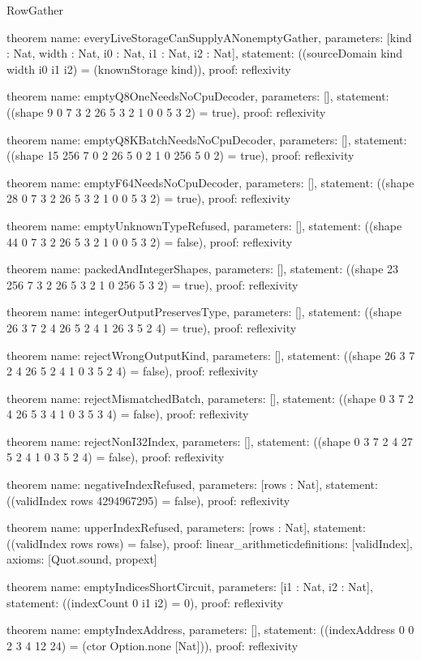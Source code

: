 \begin{lexlean}{RowGather}
\begin{semanticmodule}
theorem{
  name: everyLiveStorageCanSupplyANonemptyGather,
  parameters: [kind : Nat, width : Nat, i0 : Nat, i1 : Nat, i2 : Nat],
  statement: ((sourceDomain kind width i0 i1 i2) = (knownStorage kind)),
  proof: reflexivity{}
}

theorem{
  name: emptyQ8OneNeedsNoCpuDecoder,
  parameters: [],
  statement: ((shape 9 0 7 3 2 26 5 3 2 1 0 0 5 3 2) = true),
  proof: reflexivity{}
}

theorem{
  name: emptyQ8KBatchNeedsNoCpuDecoder,
  parameters: [],
  statement: ((shape 15 256 7 0 2 26 5 0 2 1 0 256 5 0 2) = true),
  proof: reflexivity{}
}

theorem{
  name: emptyF64NeedsNoCpuDecoder,
  parameters: [],
  statement: ((shape 28 0 7 3 2 26 5 3 2 1 0 0 5 3 2) = true),
  proof: reflexivity{}
}

theorem{
  name: emptyUnknownTypeRefused,
  parameters: [],
  statement: ((shape 44 0 7 3 2 26 5 3 2 1 0 0 5 3 2) = false),
  proof: reflexivity{}
}

theorem{
  name: packedAndIntegerShapes,
  parameters: [],
  statement: ((shape 23 256 7 3 2 26 5 3 2 1 0 256 5 3 2) = true),
  proof: reflexivity{}
}

theorem{
  name: integerOutputPreservesType,
  parameters: [],
  statement: ((shape 26 3 7 2 4 26 5 2 4 1 26 3 5 2 4) = true),
  proof: reflexivity{}
}

theorem{
  name: rejectWrongOutputKind,
  parameters: [],
  statement: ((shape 26 3 7 2 4 26 5 2 4 1 0 3 5 2 4) = false),
  proof: reflexivity{}
}

theorem{
  name: rejectMismatchedBatch,
  parameters: [],
  statement: ((shape 0 3 7 2 4 26 5 3 4 1 0 3 5 3 4) = false),
  proof: reflexivity{}
}

theorem{
  name: rejectNonI32Index,
  parameters: [],
  statement: ((shape 0 3 7 2 4 27 5 2 4 1 0 3 5 2 4) = false),
  proof: reflexivity{}
}

theorem{
  name: negativeIndexRefused,
  parameters: [rows : Nat],
  statement: ((validIndex rows 4294967295) = false),
  proof: reflexivity{}
}

theorem{
  name: upperIndexRefused,
  parameters: [rows : Nat],
  statement: ((validIndex rows rows) = false),
  proof: linear_arithmetic{definitions: [validIndex]},
  axioms: [Quot.sound, propext]
}

theorem{
  name: emptyIndicesShortCircuit,
  parameters: [i1 : Nat, i2 : Nat],
  statement: ((indexCount 0 i1 i2) = 0),
  proof: reflexivity{}
}

theorem{
  name: emptyIndexAddress,
  parameters: [],
  statement: ((indexAddress 0 0 2 3 4 12 24) = (ctor Option.none [Nat])),
  proof: reflexivity{}
}


\end{semanticmodule}
\end{lexlean}
